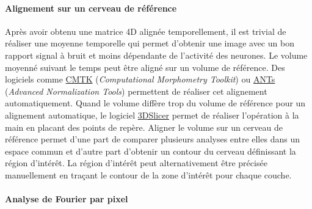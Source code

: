 \paragraph{Alignement sur un cerveau de référence}

Après avoir obtenu une matrice 4D alignée temporellement, il est trivial de réaliser une moyenne temporelle qui permet d'obtenir une image avec un bon rapport signal à bruit et moins dépendante de l'activité des neurones. Le volume moyenné suivant le temps peut être aligné sur un volume de référence. Des logiciels comme \href{https://www.nitrc.org/projects/cmtk}{CMTK} (\emph{Computational Morphometry Toolkit}) ou \href{https://stnava.github.io/ANTs/}{ANTs} (\emph{Advanced Normalization Tools}) permettent de réaliser cet alignement automatiquement. Quand le volume diffère trop du volume de référence pour un alignement automatique, le logiciel \href{https://www.slicer.org/}{3DSlicer} permet de réaliser l'opération à la main en placant des points de repère.
Aligner le volume sur un cerveau de référence permet d'une part de comparer plusieurs analyses entre elles dans un espace commun et d'autre part d'obtenir un contour du cerveau définissant la région d'intérêt. La région d'intérêt peut alternativement être précisée manuellement en traçant le contour de la zone d'intérêt pour chaque couche. 



\paragraph{Analyse de Fourier par pixel}

